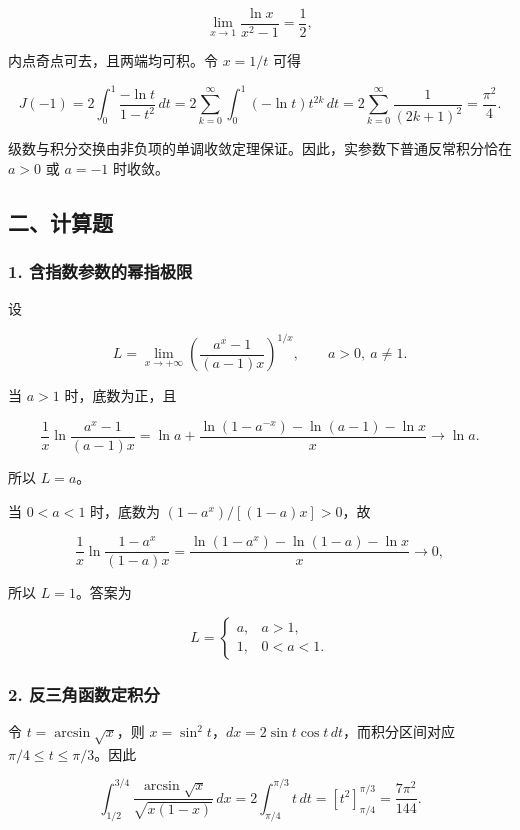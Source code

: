 \documentclass[11pt,fontset=fandol]{ctexart}
\begin{document}
\[
\lim_{x\to1}\frac{\ln x}{x^2-1}=\frac12,
\]

内点奇点可去，且两端均可积。令 \(x=1/t\) 可得

\[
J(-1)=2\int_0^1\frac{-\ln t}{1-t^2}\,dt
=2\sum_{k=0}^\infty\int_0^1(-\ln t)t^{2k}\,dt
=2\sum_{k=0}^\infty\frac1{(2k+1)^2}
=\boxed{\frac{\pi^2}{4}}.
\]

级数与积分交换由非负项的单调收敛定理保证。因此，实参数下普通反常积分恰在
\(a>0\) 或 \(a=-1\) 时收敛。

\subsection{二、计算题}\label{ux4e8cux8ba1ux7b97ux9898}

\subsubsection{1.
含指数参数的幂指极限}\label{ux542bux6307ux6570ux53c2ux6570ux7684ux5e42ux6307ux6781ux9650}

设

\[
L=\lim_{x\to+\infty}\left(\frac{a^x-1}{(a-1)x}\right)^{1/x},
\qquad a>0,\ a\ne1.
\]

当 \(a>1\) 时，底数为正，且

\[
\frac1x\ln\frac{a^x-1}{(a-1)x}
=\ln a+\frac{\ln(1-a^{-x})-\ln(a-1)-\ln x}{x}
\longrightarrow\ln a.
\]

所以 \(L=a\)。

当 \(0<a<1\) 时，底数为 \((1-a^x)/[(1-a)x]>0\)，故

\[
\frac1x\ln\frac{1-a^x}{(1-a)x}
=\frac{\ln(1-a^x)-\ln(1-a)-\ln x}{x}\longrightarrow0,
\]

所以 \(L=1\)。答案为

\[
\boxed{L=\begin{cases}a,&a>1,\\1,&0<a<1.\end{cases}}
\]

\subsubsection{2.
反三角函数定积分}\label{ux53cdux4e09ux89d2ux51fdux6570ux5b9aux79efux5206}

令 \(t=\arcsin\sqrt x\)，则
\(x=\sin^2t\)，\(dx=2\sin t\cos t\,dt\)，而积分区间对应
\(\pi/4\le t\le\pi/3\)。因此

\[
\int_{1/2}^{3/4}\frac{\arcsin\sqrt x}{\sqrt{x(1-x)}}\,dx
=2\int_{\pi/4}^{\pi/3}t\,dt
=\left[t^2\right]_{\pi/4}^{\pi/3}
=\boxed{\frac{7\pi^2}{144}}.
\]
\end{document}

